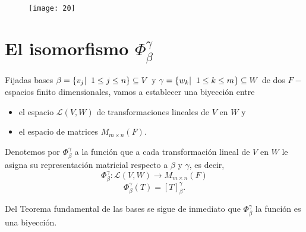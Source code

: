 \begin{figure}[H]
	\centering
	\texttt{[image: 20]} 
\end{figure}	



\section{El isomorfismo $\Phi_{\beta}^{\gamma}$}
\label{sect: iso phi}


Fijadas bases $\beta = \{ v_{j}  | \hspace{0.2cm} 1 \leq j \leq n \}
\subseteq V$ y $\gamma 
= \{ w_{k}  | \hspace{0.2cm} 1 \leq k \leq m \} 
\subseteq W$ de dos 
$F-$espacios finito dimensionales, vamos a establecer una biyección
entre
\begin{itemize}
	\item el espacio $\mathcal{L}(V, W)$ de transformaciones lineales
	de $V$ en $W$ y 
	\item el espacio de matrices $M_{m \times n}(F)$.
\end{itemize}
Denotemos por 
$\Phi_{\beta}^{\gamma}$ a la función que a cada 
transformación lineal de $V$ en $W$ le asigna su representación
matricial respecto a $\beta$ y $\gamma$, es decir, 
\[
\Phi_{\beta}^{\gamma} : \mathcal{L}(V, W) \longrightarrow M_{m \times n}(F)
\]
\[
\Phi_{\beta}^{\gamma}(T) = [T]_{\beta}^{\gamma}.
\]

Del Teorema fundamental de las bases se sigue de inmediato
que $\Phi_{\beta}^{\gamma}$ 
la función 
es una biyección. 

